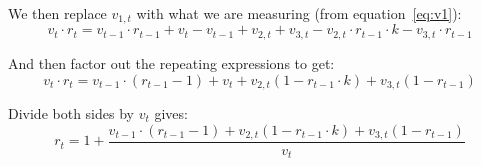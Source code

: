 \documentclass{article}
\begin{document}
We then replace $v_{1,t}$ with what we are measuring (from equation~\ref{eq:v1}):
\begin{equation}
  v_t \cdot r_t
  	= v_{t-1} \cdot r_{t-1}
	+ v_{t} - v_{t-1} + v_{2,t} + v_{3,t}
	- v_{2,t}  \cdot r_{t-1} \cdot k
	- v_{3,t}  \cdot r_{t-1}
\end{equation}

And then factor out the repeating expressions to get:
\begin{equation}
  v_t \cdot r_t
  	= v_{t-1} \cdot (r_{t-1} -1)
	+ v_{t} + v_{2,t}(1 - r_{t-1} \cdot k)  
	+ v_{3,t}(1 - r_{t-1})
\end{equation}

Divide both sides by $v_t$ gives:
\begin{equation}
  r_t
  	= 1+\frac{v_{t-1} \cdot (r_{t-1} -1)
	+ v_{2,t}(1 - r_{t-1} \cdot k)  
	+ v_{3,t}(1 - r_{t-1})}{v_t}
\end{equation}
\end{document}
